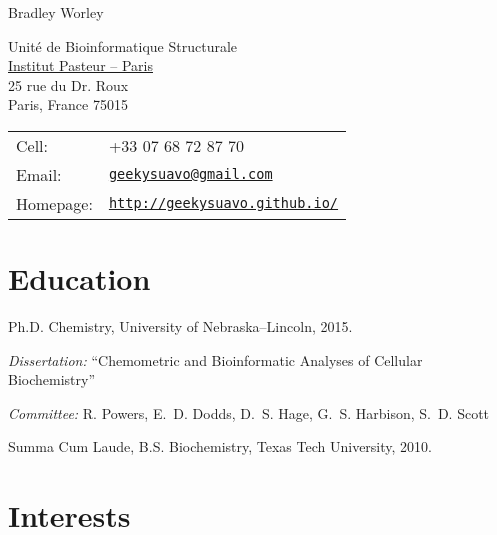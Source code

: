 \documentclass[letterpaper]{article}
\def\name{Bradley Worley}
\renewenvironment{itemize}{
  \begin{list}{}{
    \setlength{\leftmargin}{1.5em}
  }
}{
  \end{list}
}
\begin{document}
{\huge \name}
\vspace{0.25in}

\begin{minipage}{0.45\linewidth}
  Unit\'{e} de Bioinformatique Structurale \\
  \href{http://www.pasteur.fr/}{Institut Pasteur -- Paris} \\
  25 rue du Dr. Roux \\
  Paris, France 75015
\end{minipage}
\begin{minipage}{0.45\linewidth}
  \begin{tabular}{ll}
    Cell: &  +33 07 68 72 87 70 \\
    Email: & \href{mailto:geekysuavo@gmail.com}
                     {\tt geekysuavo@gmail.com} \\
    Homepage: & \href{http://geekysuavo.github.io/}
                 {\tt http://geekysuavo.github.io/} \\
  \end{tabular}
\end{minipage}


\section*{Education}

\begin{itemize}
  \item Ph.D. Chemistry, University of Nebraska--Lincoln, 2015.
  \begin{itemize}
    \item \emph{Dissertation:} ``Chemometric and Bioinformatic Analyses
      of Cellular Biochemistry''
    \item \emph{Committee:}
      R. Powers, E.~D. Dodds, D.~S. Hage,
      G.~S. Harbison, S.~D. Scott
  \end{itemize}
  \item Summa Cum Laude, B.S. Biochemistry, Texas Tech University, 2010.
\end{itemize}


\section*{Interests}
\end{document}
